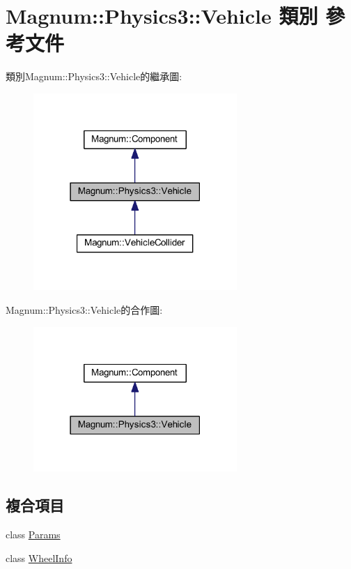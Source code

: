\hypertarget{class_magnum_1_1_physics3_1_1_vehicle}{}\section{Magnum\+:\+:Physics3\+:\+:Vehicle 類別 參考文件}
\label{class_magnum_1_1_physics3_1_1_vehicle}


類別\+Magnum\+:\+:Physics3\+:\+:Vehicle的繼承圖\+:\nopagebreak
\begin{figure}[H]
\begin{center}
\leavevmode
\includegraphics[width=219pt]{class_magnum_1_1_physics3_1_1_vehicle__inherit__graph}
\end{center}
\end{figure}


Magnum\+:\+:Physics3\+:\+:Vehicle的合作圖\+:\nopagebreak
\begin{figure}[H]
\begin{center}
\leavevmode
\includegraphics[width=219pt]{class_magnum_1_1_physics3_1_1_vehicle__coll__graph}
\end{center}
\end{figure}
\subsection*{複合項目}
\begin{DoxyCompactItemize}
\item 
class \hyperlink{class_magnum_1_1_physics3_1_1_vehicle_1_1_params}{Params}
\item 
class \hyperlink{class_magnum_1_1_physics3_1_1_vehicle_1_1_wheel_info}{Wheel\+Info}
\end{DoxyCompactItemize}
